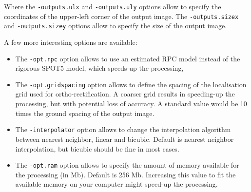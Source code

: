 Where the \verb?-outputs.ulx? and \verb?-outputs.uly? options allow to
specify the coordinates of the upper-left corner of the output image.
The \verb?-outputs.sizex? and \verb?-outputs.sizey? options allow to
specify the size of the output image.

A few more interesting options are available:
\begin{itemize}
\item The \verb?-opt.rpc? option allows to use an estimated RPC model
  instead of the rigorous SPOT5 model, which speeds-up the processing,
\item The \verb?-opt.gridspacing? option allows to define the spacing of the
  localisation grid used for ortho-rectification. A coarser grid
  results in speeding-up the processing, but with potential loss of
  accuracy. A standard value would be 10 times the ground spacing of
  the output image.
\item The \verb?-interpolator? option allows to change the interpolation
  algorithm between nearest neighbor, linear and bicubic. Default is nearest
  neighbor interpolation, but bicubic should be fine in most cases.
\item The \verb?-opt.ram? option allows to specify the amount of memory
  available for the processing (in Mb). Default is 256 Mb. Increasing
  this value to fit the available memory on your computer might
  speed-up the processing.
\end{itemize}





